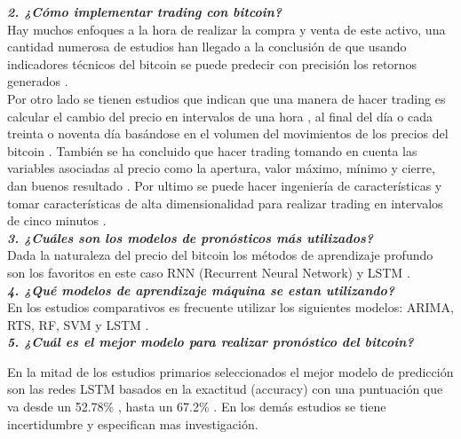 \textbf{\textit{2. ¿Cómo implementar trading con bitcoin?}}\\
Hay muchos enfoques a la hora de realizar la compra y venta de este activo, una cantidad numerosa de estudios han llegado a la conclusión de que usando indicadores técnicos del bitcoin se puede predecir con precisión los retornos generados \parencite{mudassirTimeseriesForecastingBitcoin2020}.\\
Por otro lado se tienen estudios que indican que una manera de hacer trading es calcular el cambio del precio en intervalos de una hora \parencite{phaladisailoedMachineLearningModels2018}, al final del día o cada treinta o noventa día basándose en el volumen del movimientos de los precios del bitcoin \parencite{mudassirTimeseriesForecastingBitcoin2020}. También se ha concluido que hacer trading tomando en cuenta las variables asociadas al precio como la apertura, valor máximo, mínimo y cierre, dan buenos resultado \parencite{felizardoComparativeStudyBitcoin2019,phaladisailoedMachineLearningModels2018}. Por ultimo se puede hacer ingeniería de características y tomar características de alta dimensionalidad para realizar trading en intervalos de cinco minutos \parencite{chenBitcoinPricePrediction2020} .\\

\textbf{\textit{3. ¿Cuáles son los modelos de pronósticos más utilizados?}}\\
Dada la naturaleza del precio del bitcoin los métodos de aprendizaje profundo son los favoritos en este caso RNN (Recurrent Neural Network) y LSTM \parencite{mcnallyPredictingPriceBitcoin2018}.\\

\textbf{\textit{4. ¿Qué modelos de aprendizaje máquina se estan utilizando?}}\\
En los estudios comparativos es frecuente utilizar los siguientes modelos: ARIMA, RTS, RF, SVM y LSTM \parencite{felizardoComparativeStudyBitcoin2019,phaladisailoedMachineLearningModels2018}.\\

\textbf{\textit{5. ¿Cuál es el mejor modelo para realizar pronóstico del bitcoin?}}

En la mitad de los estudios primarios seleccionados \parencite{mudassirTimeseriesForecastingBitcoin2020,chenBitcoinPricePrediction2020,mcnallyPredictingPriceBitcoin2018} el mejor modelo de predicción son las redes LSTM basados en la exactitud (accuracy) con una puntuación que va desde un 52.78\% \parencite{mcnallyPredictingPriceBitcoin2018}, hasta un 67.2\% \parencite{chenBitcoinPricePrediction2020}. En los demás estudios se tiene incertidumbre y especifican mas investigación.


